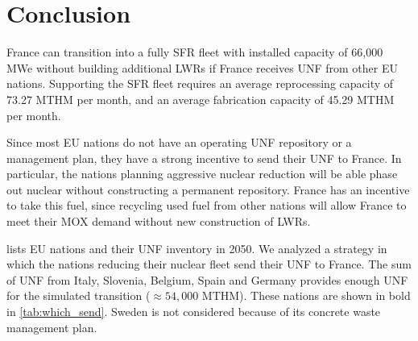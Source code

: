 \section{Conclusion}

France can transition into
a fully \gls{SFR} fleet with installed capacity of 66,000 \gls{MWe} without
building additional \glspl{LWR}
if France receives \gls{UNF} from other \gls{EU} nations.
Supporting the \gls{SFR} fleet requires an average 
reprocessing capacity of 73.27 \gls{MTHM} per month,
and an average fabrication capacity of 45.29 \gls{MTHM} per month.

Since most \gls{EU} nations do not have an operating \gls{UNF}
repository or a management plan, they have a strong incentive
to send their \gls{UNF} to France. In particular, the nations
planning aggressive nuclear reduction will be able phase out nuclear
without constructing a permanent repository. France has an
incentive to take this fuel, since recycling used fuel from
other nations will allow France to meet their MOX demand
without new construction of \glspl{LWR}.

 lists \gls{EU} nations and their \gls{UNF} inventory
in 2050. We analyzed a strategy in which 
the nations reducing their nuclear fleet send their \gls{UNF} to France.
The sum of \gls{UNF} from Italy, Slovenia, Belgium, Spain and Germany
provides enough \gls{UNF} for the simulated transition ($\approx 54,000$ MTHM). 
These nations are shown in bold in \cref{tab:which_send}.
Sweden is not considered because of its concrete waste management plan.


